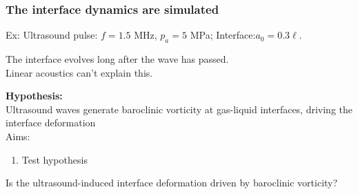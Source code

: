 % 
% 
% 
% 
\begin{frame}
  \frametitle{\vspace*{0.25cm} The interface dynamics are simulated}
  \vspace*{0.5cm}
  Ex: Ultrasound pulse: $f=1.5$ MHz, $p_a=5$ MPa; Interface:$a_0=0.3\ell$.
  \begin{figure}
    \centering
    \begin{subfigure}[b]{0.9\textwidth}
    \end{subfigure}
  \end{figure}
  \begin{center}
    \begin{minipage}{0.75\linewidth}
      The interface evolves long after the wave has passed.\vspace*{0.25cm}\\%
      Linear acoustics can't explain this.
    \end{minipage}
  \end{center}
\end{frame}
% 
% 
\begin{frame}
  \vfill
  \textbf{Hypothesis:}\\Ultrasound waves generate baroclinic vorticity at gas-liquid interfaces, driving the interface deformation\\
  \vfill
  Aims:
  \begin{enumerate}
  \item Test hypothesis \vspace{0.25cm}%
  \end{enumerate}
  \vfill
  \pause
  {\Large Is the ultrasound-induced interface deformation driven by baroclinic vorticity?}
  \vfill
\end{frame}
